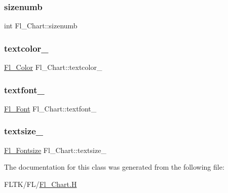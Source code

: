 \subsubsection{\texorpdfstring{sizenumb}{sizenumb}}
{\footnotesize\ttfamily int Fl\+\_\+\+Chart\+::sizenumb\hspace{0.3cm}{\ttfamily [private]}}

\mbox{\label{class_fl___chart_a258c1c3ebeb9339af1092f9d09a0bd34}} 
\subsubsection{\texorpdfstring{textcolor\+\_\+}{textcolor\_}}
{\footnotesize\ttfamily \hyperlink{_enumerations_8_h_a8b762953646f8abee866061f1af78a6a}{Fl\+\_\+\+Color} Fl\+\_\+\+Chart\+::textcolor\+\_\+\hspace{0.3cm}{\ttfamily [private]}}

\mbox{\label{class_fl___chart_a561007869d07a9ddcfd5f60175995eb2}} 
\subsubsection{\texorpdfstring{textfont\+\_\+}{textfont\_}}
{\footnotesize\ttfamily \hyperlink{_enumerations_8_h_a2ac46d9f082834b969fffe490a03a709}{Fl\+\_\+\+Font} Fl\+\_\+\+Chart\+::textfont\+\_\+\hspace{0.3cm}{\ttfamily [private]}}

\mbox{\label{class_fl___chart_af17044fa38072aa107a5760681d98fb9}} 
\subsubsection{\texorpdfstring{textsize\+\_\+}{textsize\_}}
{\footnotesize\ttfamily \hyperlink{_enumerations_8_h_ad58927f5c691454480f7cd28362502f1}{Fl\+\_\+\+Fontsize} Fl\+\_\+\+Chart\+::textsize\+\_\+\hspace{0.3cm}{\ttfamily [private]}}



The documentation for this class was generated from the following file\+:\begin{DoxyCompactItemize}
\item 
F\+L\+T\+K/\+F\+L/\hyperlink{_fl___chart_8_h}{Fl\+\_\+\+Chart.\+H}\end{DoxyCompactItemize}
